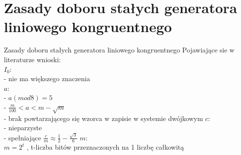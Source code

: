 \section{Zasady doboru stałych generatora liniowego kongruentnego}
	\begin{frame}{Zasady doboru stałych generatora liniowego kongruentnego}
Pojawiające sie w literaturze wnioski:\\ 
	\newline \newline
 	 $I_{0}$: \\
 	 - nie ma większego znaczenia\\
	
	$a$: \\
	- $a(mod 8)=5$ \\
	- $\frac{m}{100}<a<m-\sqrt{m}$ \\
	- brak powtarzającego się wzorca w zapisie w systemie dwójkowym
	\newline \newline
	$c$: \\
	- nieparzyste \\
 	- spełniające $ \frac{c}{m}\approx\frac{1}{2}-\frac{\sqrt{3}}{6}$
	\newline \newline
	$m$: \\
	$m=2^{t}$ , \quad t-liczba bitów przeznaczonych na 1 liczbę całkowitą


	\end{frame}
